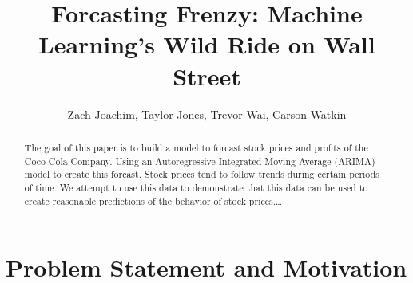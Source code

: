 \documentclass[11pt]{article}
\title{Forcasting Frenzy: Machine Learning's Wild Ride on Wall Street}
\author{Zach Joachim, Taylor Jones, Trevor Wai, Carson Watkin}
\begin{document}
\maketitle

\begin{abstract}
    The goal of this paper is to build a model to forcast stock prices and profits of the Coco-Cola Company. 
    Using an Autoregressive Integrated Moving Average (ARIMA) model to create this forcast. 
    Stock prices tend to follow trends during certain periods of time. 
    We attempt to use this data to demonstrate that this data can be used to create reasonable predictions of the behavior of stock prices.\dots
 \end{abstract}

\section{Problem Statement and Motivation}
\end{document}
